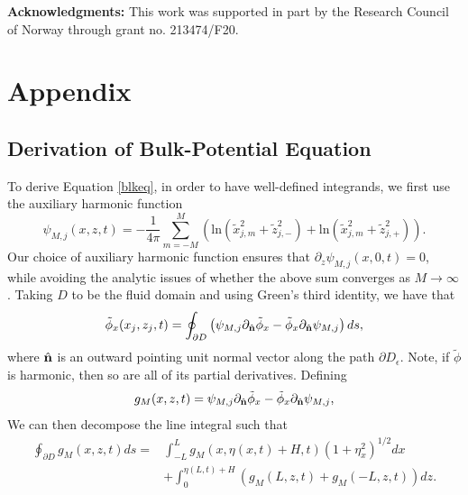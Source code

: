 \documentclass[a4paper,11pt]{article}
\newcommand{\p}{\partial}
\begin{document}
\noindent
{\bf Acknowledgments:}
This work was supported in part by the Research Council of Norway 
through grant no. 213474/F20.


\section{Appendix}
\subsection{Derivation of Bulk-Potential Equation \label{deriv}}
To derive Equation \eqref{blkeq}, in order to have well-defined integrands, we first use the auxiliary harmonic function
\[
\psi_{M,j}(x,z,t) = - \frac{1}{4\pi}\sum_{m=-M}^{M} \left( \mbox{ln}\left( \tilde{x}_{j,m}^{2} + \tilde{z}_{j,-}^{2}  \right) + \mbox{ln}\left( \tilde{x}_{j,m}^{2} + \tilde{z}_{j,+}^{2} \right)\right).
\]
Our choice of auxiliary harmonic function ensures that $\p_{z}\psi_{M,j}(x,0,t)=0$, while avoiding the analytic issues of whether the above sum converges as $M\rightarrow \infty$.  Taking $D$ to be the fluid domain and using Green's third identity, we have that 
\[
\tilde{\phi}_{x}(x_{j},z_{j},t) =  \oint_{\p D} \left(\psi_{M,j}\p_{\hat{{\bf n}}}\tilde{\phi}_{x}-\tilde{\phi}_{x}\p_{\hat{{\bf n}}}\psi_{M,j} \right) ds,
\]
where $\hat{{\bf n}}$ is an outward pointing unit normal vector along the path $\p D_{\epsilon}$.  Note, if $\tilde{\phi}$ is harmonic, then so are all of its partial derivatives.  Defining
\[
g_{M}(x,z,t) = \psi_{M,j}\p_{\hat{{\bf n}}}\tilde{\phi}_{x}-\tilde{\phi}_{x}\p_{\hat{{\bf n}}}\psi_{M,j},
\]
We can then decompose the line integral such that 
\begin{align*}
\oint_{\p D} g_{M}(x,z,t) ds = & \int_{-L}^{L}g_{M}(x,\eta(x,t)+H,t) (1+\eta_{x}^{2})^{1/2}dx \\
& + \int_{0}^{\eta(L,t)+H} \left(g_{M}(L,z,t) + g_{M}(-L,z,t)\right) dz.  
\end{align*}
\end{document}
